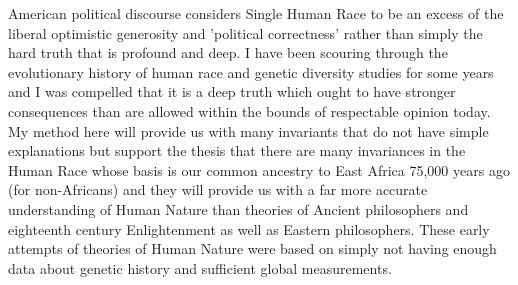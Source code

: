 \documentclass{amsart}
\begin{document}
American political discourse considers Single Human Race to be an excess of the liberal optimistic generosity and 'political correctness' rather than simply the hard truth that is profound and deep.  I have been scouring through the evolutionary history of human race and genetic diversity studies for some years and I was compelled that it is a deep truth which ought to have stronger consequences than are allowed within the bounds of respectable opinion today. My method here will provide us with many invariants that do not have simple explanations but support the thesis that there are many invariances in the Human Race whose basis is our common ancestry to East Africa 75,000 years ago (for non-Africans) and they will provide us with a far more accurate understanding of Human Nature than theories of Ancient philosophers and eighteenth century Enlightenment as well as Eastern philosophers.  These early attempts of theories of Human Nature were based on simply not having enough data about genetic history and sufficient global measurements.
\end{document}
